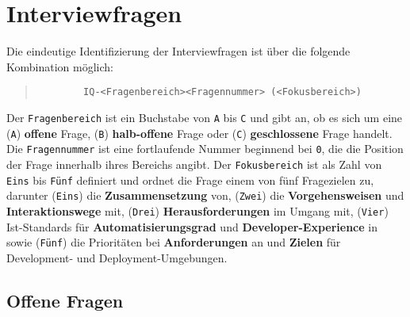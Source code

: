 \section{Interviewfragen}
\label{sec:AA-01_interview-questions}

Die eindeutige Identifizierung der Interviewfragen ist über die folgende Kombination möglich:

\begin{quote}
    \begin{verbatim}
        IQ-<Fragenbereich><Fragennummer> (<Fokusbereich>)
    \end{verbatim}
\end{quote}

Der \texttt{Fragenbereich} ist ein Buchstabe von \texttt{A} bis \texttt{C} und gibt an, ob es sich um eine (\texttt{A}) \textbf{offene} Frage, (\texttt{B}) \textbf{halb-offene} Frage oder (\texttt{C}) \textbf{geschlossene} Frage handelt. Die \texttt{Fragennummer} ist eine fortlaufende Nummer beginnend bei \texttt{0}, die die Position der Frage innerhalb ihres Bereichs angibt. Der \texttt{Fokusbereich} ist als Zahl von \texttt{Eins} bis \texttt{Fünf} definiert und ordnet die Frage einem von fünf Fragezielen zu, darunter (\texttt{Eins}) die \textbf{Zusammensetzung} von, (\texttt{Zwei}) die \textbf{Vorgehensweisen} und \textbf{Interaktionswege} mit, (\texttt{Drei}) \textbf{Herausforderungen} im Umgang mit, (\texttt{Vier}) Ist-Standards für \textbf{Automatisierungsgrad} und \textbf{Developer-Experience} in sowie (\texttt{Fünf}) die Prioritäten bei \textbf{Anforderungen} an und \textbf{Zielen} für Development- und Deployment-Umgebungen.

\clearpage

\subsection{Offene Fragen}
\label{subsec:AA-01-01_open-questions}

